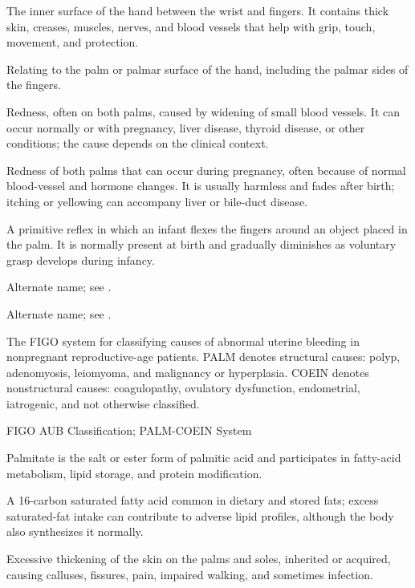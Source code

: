  The inner surface of the hand between the wrist and fingers. It contains thick skin, creases, muscles, nerves, and blood vessels that help with grip, touch, movement, and protection.

 Relating to the palm or palmar surface of the hand, including the palmar sides of the fingers.

 Redness, often on both palms, caused by widening of small blood vessels. It can occur normally or with pregnancy, liver disease, thyroid disease, or other conditions; the cause depends on the clinical context.

 Redness of both palms that can occur during pregnancy, often because of normal blood-vessel and hormone changes. It is usually harmless and fades after birth; itching or yellowing can accompany liver or bile-duct disease.

 A primitive reflex in which an infant flexes the fingers around an object placed in the palm.
It is normally present at birth and gradually diminishes as voluntary grasp develops during infancy.

 Alternate name; see .

 Alternate name; see .

 The FIGO system for classifying causes of abnormal uterine bleeding in nonpregnant reproductive-age patients. PALM denotes structural causes: polyp, adenomyosis, leiomyoma, and malignancy or hyperplasia. COEIN denotes nonstructural causes: coagulopathy, ovulatory dysfunction, endometrial, iatrogenic, and not otherwise classified.

\synonyms
FIGO AUB Classification; PALM-COEIN System

 Palmitate is the salt or ester form of palmitic acid and participates in fatty-acid metabolism, lipid storage, and protein modification.

 A 16-carbon saturated fatty acid common in dietary and stored fats; excess saturated-fat intake can contribute to adverse lipid profiles, although the body also synthesizes it normally.

 Excessive thickening of the skin on the palms and soles, inherited or acquired, causing calluses, fissures, pain, impaired walking, and sometimes infection.

